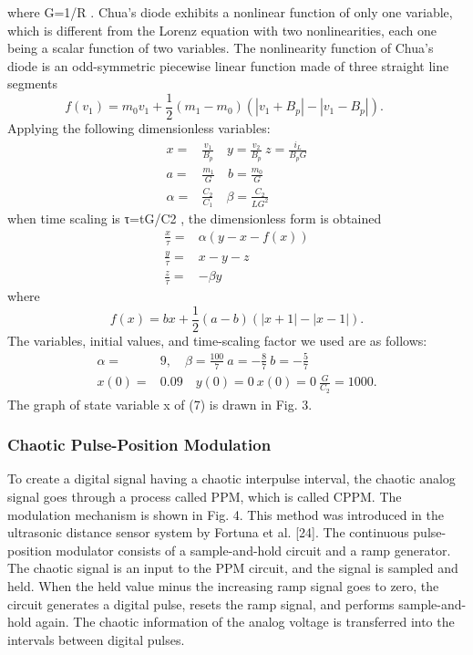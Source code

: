 where G=1/R . Chua’s diode exhibits a nonlinear function of only one variable, which is different from the Lorenz equation with two nonlinearities, each one being a scalar function of two variables. The nonlinearity function of Chua’s diode is an odd-symmetric piecewise linear function made of three straight line segments
\begin{equation*} f(v_{1})=m_{0}v_{1}+\frac {1}{2}(m_{1}-m_{0})(|v_{1}+B_{p}|-|v_{1}-B_{p}|).\qquad \tag{5}\end{equation*}
Applying the following dimensionless variables:
\begin{align*} x=&\frac {v_{1}}{B_{p}} \quad y=\frac {v_{2}}{B_{p}} ~ z=\frac {i_{L}}{B_{p}G} \\ a=&\frac {m_{1}}{G} \quad b=\frac {m_{0}}{G} \\ \alpha=&\frac {C_{2}}{C_{1}} \quad \beta =\frac {C_{2}}{LG^{2}}\tag{6}\end{align*}
when time scaling is τ=tG/C2 , the dimensionless form is obtained
\begin{align*} \frac {x}{\tau }=&\alpha (y-x-f(x)) \\ \frac {y}{\tau }=&x-y-z \\ \frac {z}{\tau }=&-\beta y \tag{7}\end{align*}
where
\begin{equation*} f(x)=bx+\frac {1}{2}(a-b)(|x+1|-|x-1|). \tag{8}\end{equation*}
The variables, initial values, and time-scaling factor we used are as follows:
\begin{align*} \alpha=&9, \quad \beta =\frac {100}{7} ~a=-\frac {8}{7}~b=-\frac {5}{7}\\ x(0)=&0.09 \quad y(0)=0 ~x(0)=0 ~\frac {G}{C_{2}}=1000.\end{align*}
The graph of state variable x of (7) is drawn in Fig. 3.

\subsubsection{Chaotic Pulse-Position Modulation}
To create a digital signal having a chaotic interpulse interval, the chaotic analog signal goes through a process called PPM, which is called CPPM. The modulation mechanism is shown in Fig. 4. This method was introduced in the ultrasonic distance sensor system by Fortuna et al. [24]. The continuous pulse-position modulator consists of a sample-and-hold circuit and a ramp generator. The chaotic signal is an input to the PPM circuit, and the signal is sampled and held. When the held value minus the increasing ramp signal goes to zero, the circuit generates a digital pulse, resets the ramp signal, and performs sample-and-hold again. The chaotic information of the analog voltage is transferred into the intervals between digital pulses.


